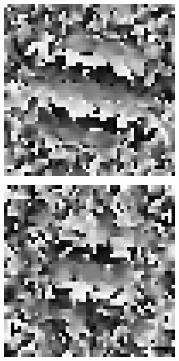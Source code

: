 \begin{figure}[htpb]
\begin{subfigure}{.25\textwidth}
\end{subfigure}%
\begin{subfigure}{.25\textwidth}
\includegraphics[width=1\textwidth]{img/PhaseDifferenceSigma150}
\end{subfigure}%
\begin{subfigure}{.25\textwidth}
\includegraphics[width=1\textwidth]{img/PhaseDifferenceSigma300}

\end{subfigure}
\end{figure}
